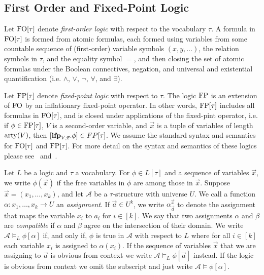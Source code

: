 \documentclass[../paper.tex]{subfiles}
\begin{document}
\subsection{First Order and Fixed-Point Logic}
Let $\text{\upshape FO}[\tau]$ denote \emph{first-order logic} with respect to the vocabulary
$\tau$. A formula in $\text{\upshape FO}[\tau]$ is formed from atomic formulas, each formed
using variables from some countable sequence of (first-order) variable symbols
$(x, y, \ldots)$, the relation symbols in $\tau$, and the equality symbol $=$,
and then closing the set of atomic formulas under the Boolean connectives,
negation, and universal and existential quantification (i.e. $\land$, $\lor$,
$\neg$, $\forall$, and $\exists$).

Let $\text{\upshape FP}[\tau]$ denote \emph{fixed-point logic} with respect to $\tau$. The
logic $\text{\upshape FP}$ is an extension of $\text{\upshape FO}$ by an inflationary fixed-point operator. In
other words, $\text{\upshape FP}[\tau]$ includes all formulas in $\text{\upshape FO}[\tau]$, and is closed
under applications of the fixed-pint operator, i.e. if $\phi \in \text{\upshape FP}[\tau]$, $V$
is a second-order variable, and $\vec{x}$ is a tuple of variables of length
$\mathrm{arty}(V)$, then $[\text{\textbf{ifp}}_{V, \vec{x}}. \phi] \in FP[\tau]$. We assume the
standard syntax and semantics for $\text{\upshape FO}[\tau]$ and $\text{\upshape FP}[\tau]$. For more detail
on the syntax and semantics of these logics please
see~\cite{grohe2017descriptive} and~\cite{GradelP15a}.

Let $L$ be a logic and $\tau$ a vocabulary. For $\phi \in L[\tau]$ and a
sequence of variables $\vec{x}$, we write $\phi(\vec{x})$ if the free variables
in $\phi$ are among those in $\vec{x}$. Suppose $\vec{x} = (x_1, \ldots , x_k)$,
and let $\mathcal{A}$ be a $\tau$-structure with universe $U$. We call a
function $\alpha : {x_1, \ldots, x_k} \rightarrow U$ an \emph{assignment}. If
$\vec{a}\in U^k$, we write $\alpha^{\vec{x}}_{\vec{a}}$ to denote the assignment
that maps the variable $x_i$ to $a_i$ for $i \in [k]$. We say that two
assignments $\alpha$ and $\beta$ are \emph{compatible} if $\alpha$ and $\beta$
agree on the intersection of their domain. We write $\mathcal{A} \models_L
\phi[\alpha]$ if, and only if, $\phi$ is true in $\mathcal{A}$ with respect to
$L$ where for all $i \in [k]$ each variable $x_i$ is assigned to $\alpha(x_i)$.
If the sequence of variables $\vec{x}$ that we are assigning to $\vec{a}$ is
obvious from context we write $\mathcal{A} \models_L \phi[\vec{a}]$ instead. If
the logic is obvious from context we omit the subscript and just write
$\mathcal{A} \models \phi[\alpha]$.
\end{document}
